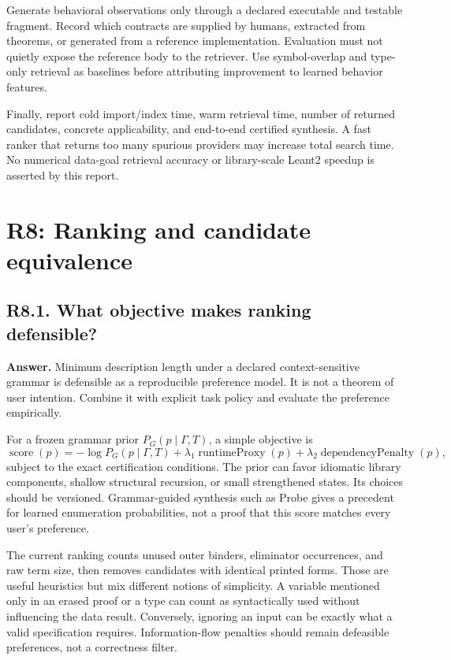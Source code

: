 \documentclass[11pt,a4paper]{article}
\newcommand{\question}[2]{\subsection{#1. #2}\label{q:#1}}
\theoremstyle{definition}
\theoremstyle{remark}
\begin{document}
Generate behavioral observations only through a declared executable and testable fragment. Record which contracts are supplied by humans, extracted from theorems, or generated from a reference implementation. Evaluation must not quietly expose the reference body to the retriever. Use symbol-overlap and type-only retrieval as baselines before attributing improvement to learned behavior features.

Finally, report cold import/index time, warm retrieval time, number of returned candidates, concrete applicability, and end-to-end certified synthesis. A fast ranker that returns too many spurious providers may increase total search time. No numerical data-goal retrieval accuracy or library-scale Leant2 speedup is asserted by this report.

\section{R8: Ranking and candidate equivalence}\label{sec:r8}

\question{R8.1}{What objective makes ranking defensible?}

\textbf{Answer.} Minimum description length under a declared context-sensitive grammar is defensible as a reproducible preference model. It is not a theorem of user intention. Combine it with explicit task policy and evaluate the preference empirically.

For a frozen grammar prior $P_G(p\mid\Gamma,T)$, a simple objective is
\[
 \operatorname{score}(p)=
 -\log P_G(p\mid\Gamma,T)
 +\lambda_1\operatorname{runtimeProxy}(p)
 +\lambda_2\operatorname{dependencyPenalty}(p),
\]
subject to the exact certification conditions. The prior can favor idiomatic library components, shallow structural recursion, or small strengthened states. Its choices should be versioned. Grammar-guided synthesis such as Probe gives a precedent for learned enumeration probabilities, not a proof that this score matches every user's preference.\cite{probe}

The current ranking counts unused outer binders, eliminator occurrences, and raw term size, then removes candidates with identical printed forms.\cite{repo-engine} Those are useful heuristics but mix different notions of simplicity. A variable mentioned only in an erased proof or a type can count as syntactically used without influencing the data result. Conversely, ignoring an input can be exactly what a valid specification requires. Information-flow penalties should remain defeasible preferences, not a correctness filter.
\end{document}
